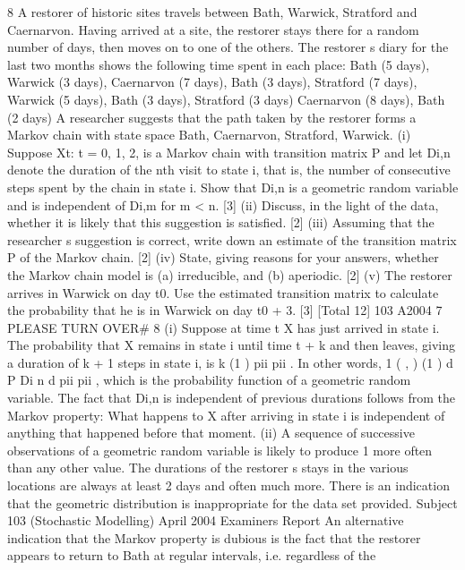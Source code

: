 
8 A restorer of historic sites travels between Bath, Warwick, Stratford and Caernarvon.
Having arrived at a site, the restorer stays there for a random number of days, then
moves on to one of the others. The restorer s diary for the last two months shows the
following time spent in each place:
Bath (5 days), Warwick (3 days), Caernarvon (7 days), Bath (3 days),
Stratford (7 days), Warwick (5 days), Bath (3 days), Stratford (3 days)
Caernarvon (8 days), Bath (2 days)
A researcher suggests that the path taken by the restorer forms a Markov chain with
state space {Bath, Caernarvon, Stratford, Warwick}.
(i) Suppose {Xt: t = 0, 1, 2, } is a Markov chain with transition matrix P and let
Di,n denote the duration of the nth visit to state i, that is, the number of
consecutive steps spent by the chain in state i. Show that Di,n is a geometric
random variable and is independent of Di,m for m < n. [3]
(ii) Discuss, in the light of the data, whether it is likely that this suggestion is
satisfied. [2]
(iii) Assuming that the researcher s suggestion is correct, write down an estimate
of the transition matrix P of the Markov chain. [2]
(iv) State, giving reasons for your answers, whether the Markov chain model is
(a) irreducible, and (b) aperiodic. [2]
(v) The restorer arrives in Warwick on day t0. Use the estimated transition matrix
to calculate the probability that he is in Warwick on day t0 + 3. [3]
[Total 12]
103 A2004 7 PLEASE TURN OVER#
8 (i) Suppose at time t X has just arrived in state i. The probability that X remains
in state i until time t + k and then leaves, giving a duration of k + 1 steps in
state i, is k (1 )
pii pii . In other words, 1
( , ) (1 ) d
P Di n d pii pii , which is
the probability function of a geometric random variable.
The fact that Di,n is independent of previous durations follows from the
Markov property: What happens to X after arriving in state i is independent of
anything that happened before that moment.
(ii) A sequence of successive observations of a geometric random variable is
likely to produce 1 more often than any other value. The durations of the
restorer s stays in the various locations are always at least 2 days and often
much more. There is an indication that the geometric distribution is
inappropriate for the data set provided.
Subject 103 (Stochastic Modelling) April 2004 Examiners Report
An alternative indication that the Markov property is dubious is the fact that
the restorer appears to return to Bath at regular intervals, i.e. regardless of the
